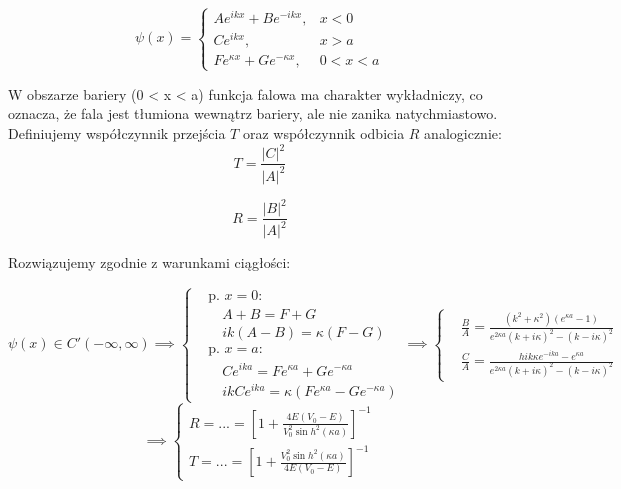 


\begin{equation*}
    \psi(x) =
    \begin{cases}
        A e^{ikx} + B e^{-ikx}, & x < 0 \\
        C e^{ikx}, & x > a \\
        F e^{\kappa x} + G e^{-\kappa x}, & 0 < x < a
    \end{cases}
\end{equation*}

W obszarze bariery (0 < x < a) funkcja falowa ma charakter wykładniczy, co oznacza,
że fala jest tłumiona wewnątrz bariery, ale nie zanika natychmiastowo. \\

Definiujemy współczynnik przejścia $T$ oraz współczynnik odbicia $R$ analogicznie:
\begin{equation*}
    T = \frac{\left| C \right| ^2}{\left| A \right| ^2}
\end{equation*}

\begin{equation*}
    R = \frac{\left| B \right|^2}{\left| A \right|^2}
\end{equation*}

\newpage
Rozwiązujemy zgodnie z warunkami ciągłości:


\begin{equation*}
    \psi(x) \in C'(-\infty, \infty) \implies
    \left\{
    \begin{aligned}
      &\text{p. } x=0: \\
      &\quad A + B = F + G \\
      &\quad ik(A - B) = \kappa (F - G) \\[1.5ex]
      &\text{p. } x=a: \\
      &\quad C e^{ika} = F e^{\kappa a} + G e^{-\kappa a} \\
      &\quad ikC e^{ika} = \kappa (F e^{\kappa a} - G e^{-\kappa a})
    \end{aligned}
    \right.
    \implies
    \left\{
    \begin{aligned}
      &\frac{B}{A} = \frac{(k^2 + \kappa^2)(e^{\kappa a} - 1)}{e^{2\kappa a}(k + i\kappa)^2 - (k - i\kappa)^2} \\
      &\frac{C}{A} = \frac{h i k \kappa e^{-ika} - e^{\kappa a}}{e^{2\kappa a}(k + i\kappa)^2 - (k - i\kappa)^2}
    \end{aligned}
    \right.
\end{equation*}
%
\begin{equation*}
    \implies
    \begin{cases}
        R = ... = \left[ 1 + \frac{4 E (V_0 - E)}{V_0^2 \sin h^2(\kappa a)} \right] ^{-1} \\
        T = ... = \left[ 1 + \frac{V_0^2 \sin h^2(\kappa a)}{4 E (V_0 - E)} \right] ^{-1}
    \end{cases}
\end{equation*}

